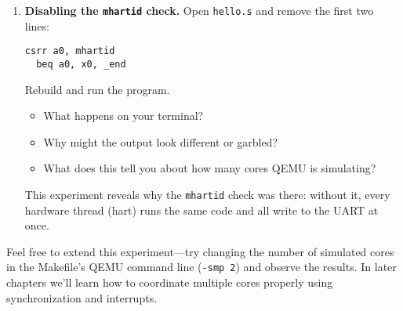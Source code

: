 \begin{enumerate}
  \item \textbf{Disabling the \texttt{mhartid} check.}
  Open \texttt{hello.s} and remove the first two lines:
  \begin{lstlisting}[style=oscode,language={[x86masm]Assembler}]
  csrr a0, mhartid
  beq a0, x0, _end
  \end{lstlisting}
  Rebuild and run the program.
  \begin{itemize}
    \item What happens on your terminal?
    \item Why might the output look different or garbled?
    \item What does this tell you about how many cores QEMU is simulating?
  \end{itemize}
  This experiment reveals why the \texttt{mhartid} check was there: without it,
  every hardware thread (hart) runs the same code and all write to the UART at
  once.
\end{enumerate}

\bigskip
\noindent
Feel free to extend this experiment—try changing the number of simulated cores
in the Makefile’s QEMU command line (\texttt{-smp 2}) and observe the results.
In later chapters we’ll learn how to coordinate multiple cores properly using
synchronization and interrupts.
